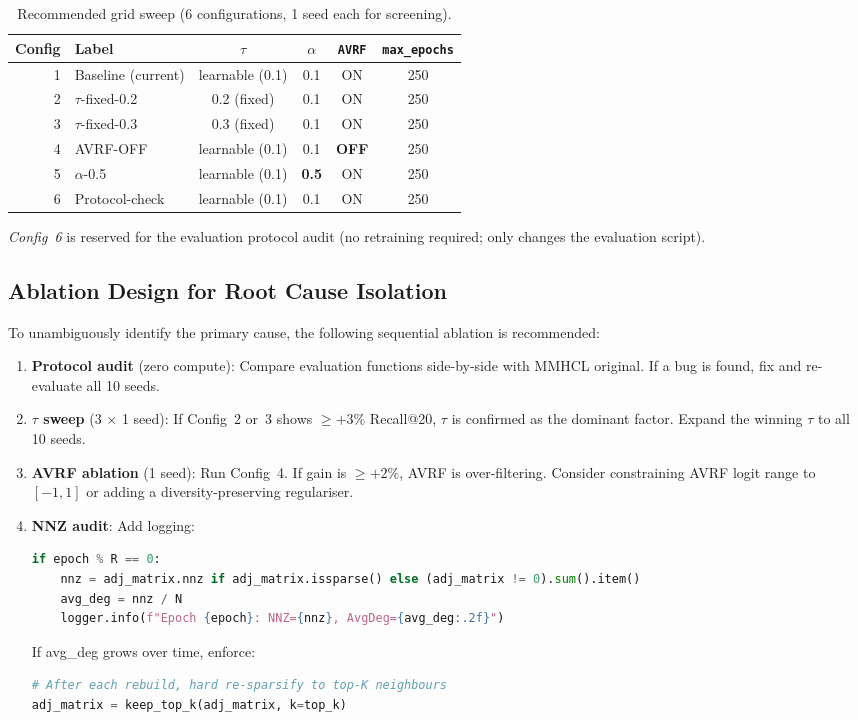 \documentclass[12pt,a4paper]{article}
\begin{document}
\begin{table}[htbp]
\centering
\caption{Recommended grid sweep (6 configurations, 1 seed each for screening).}
\label{tab:sweep}
\begin{tabular}{|r|l|c|c|c|c|}
\hline
\rowcolor{tabhead}\textbf{Config} & \textbf{Label} & $\tau$ & $\alpha$ & \texttt{AVRF} & \texttt{max\_epochs} \\
\hline
1 & Baseline (current) & learnable (0.1) & 0.1 & ON & 250 \\\hline
2 & $\tau$-fixed-0.2   & 0.2 (fixed)     & 0.1 & ON & 250 \\\hline
3 & $\tau$-fixed-0.3   & 0.3 (fixed)     & 0.1 & ON & 250 \\\hline
4 & AVRF-OFF           & learnable (0.1) & 0.1 & \textbf{OFF} & 250 \\\hline
5 & $\alpha$-0.5       & learnable (0.1) & \textbf{0.5} & ON & 250 \\\hline
6 & Protocol-check     & learnable (0.1) & 0.1 & ON & 250 \\\hline
\end{tabular}
\end{table}

\textit{Config~6} is reserved for the evaluation protocol audit (no
retraining required; only changes the evaluation script).

\subsection{Ablation Design for Root Cause Isolation}

To unambiguously identify the primary cause, the following sequential
ablation is recommended:

\begin{enumerate}[leftmargin=*]
  \item \textbf{Protocol audit} (zero compute): Compare evaluation
        functions side-by-side with MMHCL original.  If a bug is found,
        fix and re-evaluate all 10 seeds.
  \item \textbf{$\tau$ sweep} (3 $\times$ 1 seed): If Config~2 or~3
        shows $\geq +3\%$ Recall@20, $\tau$ is confirmed as the
        dominant factor.  Expand the winning $\tau$ to all 10 seeds.
  \item \textbf{AVRF ablation} (1 seed): Run Config~4.  If gain is
        $\geq +2\%$, AVRF is over-filtering.  Consider constraining
        AVRF logit range to $[-1, 1]$ or adding a diversity-preserving
        regulariser.
  \item \textbf{NNZ audit}: Add logging:
\begin{lstlisting}[language=Python]
if epoch % R == 0:
    nnz = adj_matrix.nnz if adj_matrix.issparse() else (adj_matrix != 0).sum().item()
    avg_deg = nnz / N
    logger.info(f"Epoch {epoch}: NNZ={nnz}, AvgDeg={avg_deg:.2f}")
\end{lstlisting}
        If avg\_deg grows over time, enforce:
\begin{lstlisting}[language=Python]
# After each rebuild, hard re-sparsify to top-K neighbours
adj_matrix = keep_top_k(adj_matrix, k=top_k)
\end{lstlisting}
\end{enumerate}
\end{document}
